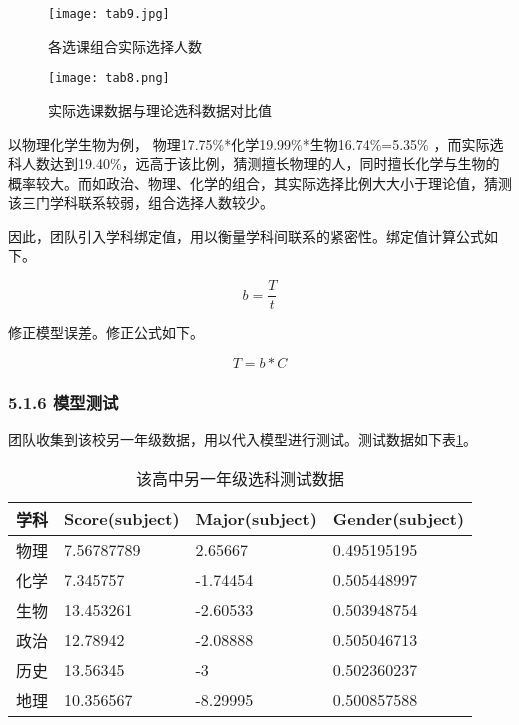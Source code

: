 \documentclass[bwprint]{cumcmthesis}
\begin{document}
\begin{figure}[!ht]
	\centering
	\texttt{[image: tab9.jpg]}
	\caption{各选课组合实际选择人数}
\end{figure}
\begin{figure}[!ht]
	\centering
	\texttt{[image: tab8.png]}
	\caption{实际选课数据与理论选科数据对比值}
\end{figure}
\newpage
以物理化学生物为例， 物理17.75\%*化学19.99\%*生物16.74\%=5.35\% ，而实际选科人数达到19.40\%，远高于该比例，猜测擅长物理的人，同时擅长化学与生物的概率较大。而如政治、物理、化学的组合，其实际选择比例大大小于理论值，猜测该三门学科联系较弱，组合选择人数较少。

因此，团队引入学科绑定值，用以衡量学科间联系的紧密性。绑定值计算公式如下。

\begin{equation}
b = \frac{T}{t}
\end{equation}

修正模型误差。修正公式如下。

\begin{equation}
\label{rapired}
T = b*C
\end{equation}

\subsubsection{5.1.6 模型测试}
团队收集到该校另一年级数据，用以代入模型进行测试。测试数据如下表\ref{tab:test}。
	\begin{longtable}{p{2cm}p{4cm}p{4cm}p{3.5cm}}
		
		\caption{\label{tab:test}该高中另一年级选科测试数据}\\
		\toprule
		学科    & \multicolumn{1}{l}{Score(subject)} & \multicolumn{1}{l}{Major(subject)} & \multicolumn{1}{l}{Gender(subject)} \\
		\midrule
		物理    & 7.56787789 & 2.65667 & 0.495195195 \\
		化学    & 7.345757 & -1.74454 & 0.505448997 \\
		生物    & 13.453261 & -2.60533 & 0.503948754 \\
		政治    & 12.78942 & -2.08888 & 0.505046713 \\
		历史    & 13.56345 & -3    & 0.502360237 \\
		地理    & 10.356567 & -8.29995 & 0.500857588 \\
		\bottomrule
	\end{longtable}%
\end{document}
